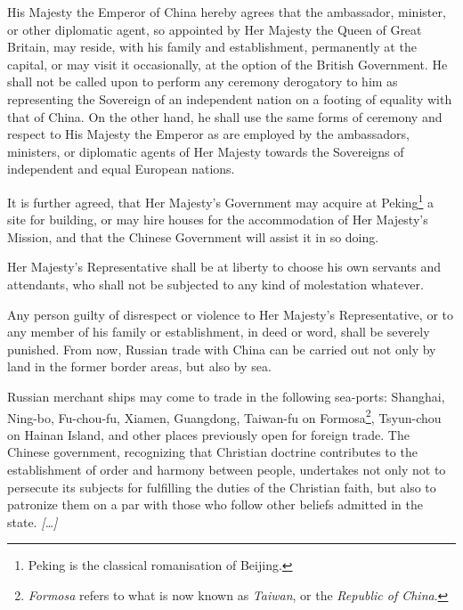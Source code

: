 \begin{fancyquote}
	\vspace*{0.5em}
	\vspace*{0.5em}
	His Majesty the Emperor of China hereby agrees that the ambassador, minister, or other diplomatic agent, so appointed by Her Majesty the Queen of Great Britain, may reside, with his family and establishment, permanently at the capital, or may visit it occasionally, at the option of the British Government. He shall not be called upon to perform any ceremony derogatory to him as representing the Sovereign of an independent nation on a footing of equality with that of China. On the other hand, he shall use the same forms of ceremony and respect to His Majesty the Emperor as are employed by the ambassadors, ministers, or diplomatic agents of Her Majesty towards the Sovereigns of independent and equal European nations.
	
	It is further agreed, that Her Majesty's Government may acquire at Peking\footnote{Peking is the classical romanisation of Beijing.} a site for building, or may hire houses for the accommodation of Her Majesty's Mission, and that the Chinese Government will assist it in so doing.
	
	Her Majesty's Representative shall be at liberty to choose his own servants and attendants, who shall not be subjected to any kind of molestation whatever.
	
	Any person guilty of disrespect or violence to Her Majesty's Representative, or to any member of his family or establishment, in deed or word, shall be severely punished. 
	From now, Russian trade with China can be carried out not only by land in the former border areas, but also by sea.
	
	Russian merchant ships may come to trade in the following sea-ports: Shanghai, Ning-bo, Fu-chou-fu, Xiamen, Guangdong, Taiwan-fu on Formosa\footnote{\textit{Formosa} refers to what is now known as \textit{Taiwan}, or the \textit{Republic of China}.}, Tsyun-chou on Hainan Island, and other places previously open for foreign trade.
	\clearpage
	The Chinese government, recognizing that Christian doctrine contributes to the establishment of order and harmony between people, undertakes not only not to persecute its subjects for fulfilling the duties of the Christian faith, but also to patronize them on a par with those who follow other beliefs admitted in the state. \emph{[\ldots]}
\end{fancyquote}
